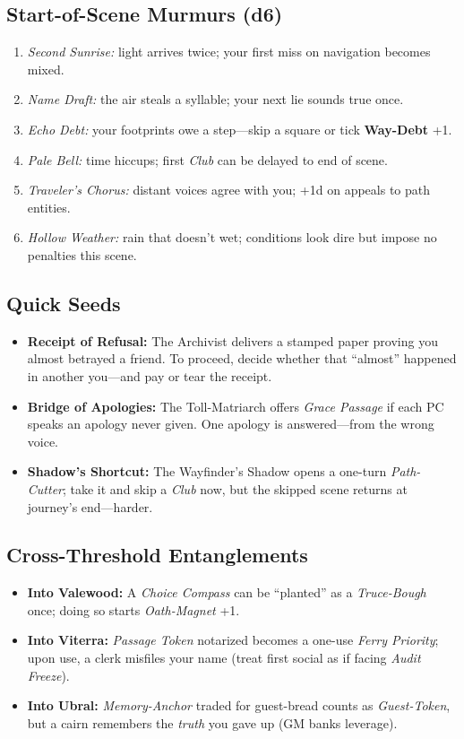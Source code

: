 \subsection*{Start-of-Scene Murmurs (d6)}
\begin{enumerate}
  \item \emph{Second Sunrise:} light arrives twice; your first miss on navigation becomes mixed.
  \item \emph{Name Draft:} the air steals a syllable; your next lie sounds true once.
  \item \emph{Echo Debt:} your footprints owe a step—skip a square or tick \textbf{Way-Debt} +1.
  \item \emph{Pale Bell:} time hiccups; first \emph{Club} can be delayed to end of scene.
  \item \emph{Traveler’s Chorus:} distant voices agree with you; +1d on appeals to path entities.
  \item \emph{Hollow Weather:} rain that doesn’t wet; conditions look dire but impose no penalties this scene.
\end{enumerate}

\subsection*{Quick Seeds}
\begin{itemize}
  \item \textbf{Receipt of Refusal:} The Archivist delivers a stamped paper proving you almost betrayed a friend. To proceed, decide whether that “almost” happened in another you—and pay or tear the receipt.
  \item \textbf{Bridge of Apologies:} The Toll-Matriarch offers \emph{Grace Passage} if each PC speaks an apology never given. One apology is answered—from the wrong voice.
  \item \textbf{Shadow’s Shortcut:} The Wayfinder’s Shadow opens a one-turn \emph{Path-Cutter}; take it and skip a \emph{Club} now, but the skipped scene returns at journey’s end—harder.
\end{itemize}

\subsection*{Cross-Threshold Entanglements}
\begin{itemize}
  \item \textbf{Into Valewood:} A \emph{Choice Compass} can be “planted” as a \emph{Truce-Bough} once; doing so starts \emph{Oath-Magnet} +1.
  \item \textbf{Into Viterra:} \emph{Passage Token} notarized becomes a one-use \emph{Ferry Priority}; upon use, a clerk misfiles your name (treat first social as if facing \emph{Audit Freeze}).
  \item \textbf{Into Ubral:} \emph{Memory-Anchor} traded for guest-bread counts as \emph{Guest-Token}, but a cairn remembers the \emph{truth} you gave up (GM banks leverage).
\end{itemize}